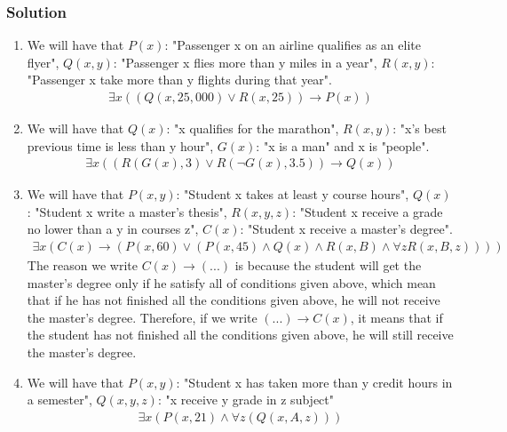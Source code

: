 \documentclass{article}
\begin{document}
\subsubsection*{Solution}
\begin{enumerate} [label = (\alph*)]
    \item We will have that $P(x)$: "Passenger x on an airline qualifies as an elite flyer", $Q(x, y)$: "Passenger x flies more than y miles in a year", $R(x, y)$: "Passenger x take more than y flights during that year".
          \begin{align}
              \exists x((Q(x, 25,000) \lor R(x, 25)) \rightarrow P(x)) \nonumber
          \end{align}
    \item We will have that $Q(x)$: "x qualifies for the marathon", $R(x, y)$: "x's best previous time is less than y hour", $G(x)$: "x is a man" and x is "people".
          \begin{align}
              \exists x((R(G(x),3) \lor R(\lnot G(x), 3.5)) \rightarrow Q(x)) \nonumber
          \end{align}
    \item We will have that $P(x, y)$: "Student x takes at least y course hours", $Q(x)$: "Student x write a master's thesis", $R(x, y, z)$: "Student x receive a grade no lower than a y in courses z", $C(x)$: "Student x receive a master's degree".
          \begin{align}
              \exists x(C(x) \rightarrow (P(x,60) \lor (P(x,45) \land Q(x) \land R(x, B) \land \forall zR(x, B, z)))) \nonumber
          \end{align}
          The reason we write $C(x) \rightarrow (...)$ is because the student will get the master's degree only if he satisfy all of conditions given above, which mean that if he has not finished all the conditions given above, he will not receive the master's degree. Therefore, if we write $(...) \rightarrow C(x)$, it means that if the student has not finished all the conditions given above, he will still receive the master's degree.
    \item We will have that $P(x, y)$: "Student x has taken more than y credit hours in a semester", $Q(x, y, z)$: "x receive y grade in z subject"
          \begin{align}
              \exists x(P(x, 21) \land \forall z(Q(x, A, z))) \nonumber
          \end{align}
\end{enumerate}
\end{document}
